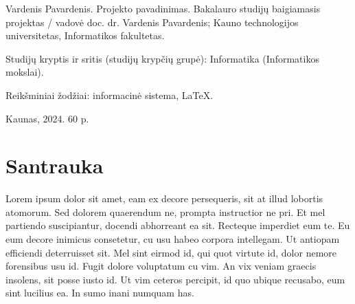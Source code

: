 \thispagestyle{noNumber}
Vardenis Pavardenis. Projekto pavadinimas.
Bakalauro studijų baigiamasis projektas / vadovė doc. dr. Vardenis Pavardenis; Kauno technologijos universitetas, Informatikos
fakultetas.

Studijų kryptis ir sritis (studijų krypčių grupė): Informatika (Informatikos mokslai).

Reikšminiai žodžiai: informacinė sistema, LaTeX.

Kaunas, 2024. 60 p.
\section*{Santrauka}
Lorem ipsum dolor sit amet, eam ex decore persequeris, sit at illud lobortis
atomorum. Sed dolorem quaerendum ne, prompta instructior ne pri. Et mel
partiendo suscipiantur, docendi abhorreant ea sit. Recteque imperdiet eum te.
Eu eum decore inimicus consetetur, cu usu habeo corpora intellegam. Ut antiopam
efficiendi deterruisset sit. Mel sint eirmod id, qui quot virtute id, dolor
nemore forensibus usu id. Fugit dolore voluptatum cu vim. An vix veniam graecis
insolens, sit posse iusto id. Ut vim ceteros percipit, id quo ubique recusabo,
eum sint lucilius ea. In sumo inani numquam has.

\pagebreak
